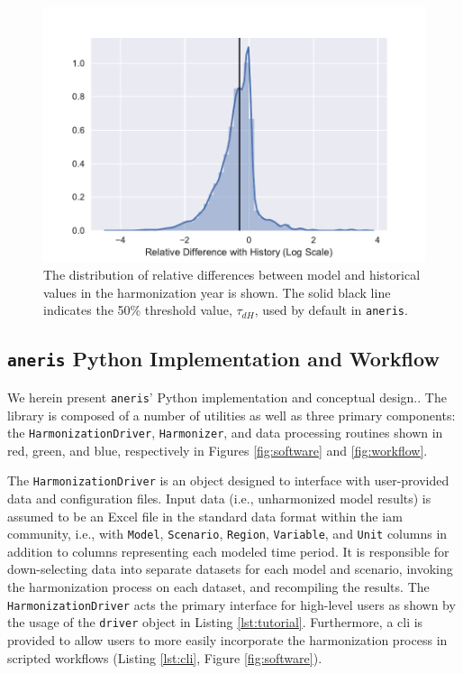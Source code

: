 \documentclass[review]{elsarticle}
\newcommand{\code}[1]{\lstinline[basicstyle=\ttfamily\color{black}]|#1|}
\begin{document}
\begin{figure}
  \begin{center}
    \includegraphics[width=\textwidth]{dh.pdf}
    \caption[]{
      \label{fig:dh}
      The distribution of relative differences between model and historical
      values in the harmonization year is shown. The solid black line indicates
      the 50\% threshold value, $\tau_{dH}$, used by default in \code{aneris}.
    }
  \end{center}
\end{figure}

\subsection{\code{aneris} Python Implementation and Workflow}\label{sec:workflow}

We herein present \code{aneris}' Python implementation and conceptual
design.. The library is composed of a number of utilities as well as three
primary components: the \texttt{HarmonizationDriver}, \texttt{Harmonizer}, and
data processing routines shown in red, green, and blue, respectively in Figures
\ref{fig:software} and \ref{fig:workflow}.

The \texttt{HarmonizationDriver} is an object designed to interface with
user-provided data and configuration files. Input data (i.e., unharmonized model
results) is assumed to be an Excel file in the standard data format within the
\gls{iam} community, i.e., with \code{Model}, \code{Scenario}, \code{Region},
\code{Variable}, and \code{Unit} columns in addition to columns representing
each modeled time period. It is responsible for down-selecting data into
separate datasets for each model and scenario, invoking the harmonization
process on each dataset, and recompiling the results. The
\texttt{HarmonizationDriver} acts the primary interface for high-level users as
shown by the usage of the \texttt{driver} object in Listing
\ref{lst:tutorial}. Furthermore, a \gls{cli} is provided to allow users to more
easily incorporate the harmonization process in scripted workflows (Listing
\ref{lst:cli}, Figure \ref{fig:software}).
\end{document}
